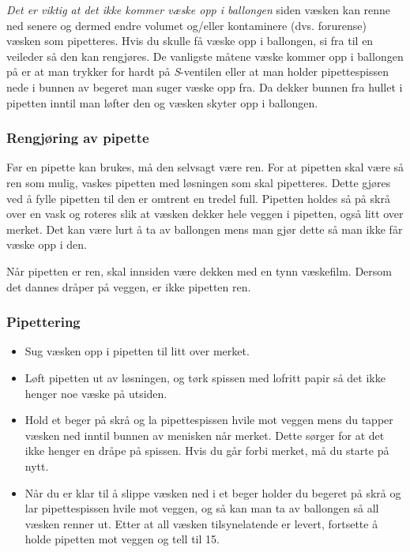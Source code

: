 	\noindent\emph{Det er viktig at det ikke kommer væske opp i ballongen} siden væsken kan renne ned senere og dermed endre volumet og/eller kontaminere (dvs. forurense) væsken som pipetteres. Hvis du skulle få væske opp i ballongen, si fra til en veileder så den kan rengjøres. De vanligste måtene væske kommer opp i ballongen på er at man trykker for hardt på \emph{S}-ventilen eller at man holder pipettespissen nede i bunnen av begeret man suger væske opp fra. Da dekker bunnen fra hullet i pipetten inntil man løfter den og væsken skyter opp i ballongen.
	
	\subsubsection{Rengjøring av pipette}
	Før en pipette kan brukes, må den selvsagt være ren. For at pipetten skal være så ren som mulig, vaskes pipetten med løsningen som skal pipetteres. Dette gjøres ved å fylle pipetten til den er omtrent en tredel full. Pipetten holdes så på skrå over en vask og roteres slik at væsken dekker hele veggen i pipetten, også litt over merket. Det kan være lurt å ta av ballongen mens man gjør dette så man ikke får væske opp i den.
	
	Når pipetten er ren, skal innsiden være dekken med en tynn væskefilm. Dersom det dannes dråper på veggen, er ikke pipetten ren.
	
	\subsubsection{Pipettering}
	\begin{itemize}
		\item Sug væsken opp i pipetten til litt over merket. 
		
		\item Løft pipetten ut av løsningen, og tørk spissen med lofritt papir så det ikke henger noe væske på utsiden.
		
		\item Hold et beger på skrå og la pipettespissen hvile mot veggen mens du tapper væsken ned inntil bunnen av menisken når merket. Dette sørger for at det ikke henger en dråpe på spissen. Hvis du går forbi merket, må du starte på nytt.
		
		\item Når du er klar til å slippe væsken ned i et beger holder du begeret på skrå og lar pipettespissen hvile mot veggen, og så kan man ta av ballongen så all væsken renner ut. Etter at all væsken tilsynelatende er levert, fortsette å holde pipetten mot veggen og tell til 15. 
	\end{itemize}

